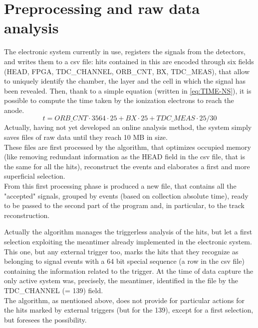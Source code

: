 \documentclass[a4paper,11pt]{book}
\begin{document}
\chapter{Preprocessing and raw data analysis}

The electronic system currently in use, registers the signals from the detectors, and writes them to a csv file: hits contained in this are encoded through six fields (HEAD, FPGA, TDC\_CHANNEL, ORB\_CNT, BX, TDC\_MEAS), that allow to uniquely identify the chamber, the layer and the cell in which the signal has been revealed. Then, thank to a simple equation (written in \ref{eq:TIME-NS}), it is possible to compute the time taken by the ionization electrons to reach the anode.
\begin{equation}
t = ORB\_CNT\cdot3564\cdot25+BX\cdot25+TDC\_MEAS\cdot25/30
\label{eq:TIME-NS}
\end{equation}
Actually, having not yet developed an online analysis method, the system simply saves files of raw data until they reach 10 MB in size.\\
These files are first processed by the algorithm, that optimizes occupied memory (like removing redundant information as the HEAD field in the csv file, that is the same for all the hits), reconstruct the events and elaborates a first and more superficial selection.\\
From this first processing phase is produced a new file, that contains all the "accepted" signals, grouped by events (based on collection absolute time), ready to be passed to the second part of the program and, in particular, to the track reconstruction.\\

\begin{footnotesize}
Actually the algorithm manages the triggerless analysis of the hits, but let a first selection exploiting the meantimer already implemented in the electronic system. This one, but any external trigger too, marks the hits that they recognize as belonging to signal events with a 64 bit special sequence (a row in the csv file) containing the information related to the trigger. At the time of data capture the only active system was, precisely, the meantimer, identified in the file by the TDC\_CHANNEL (= 139) field.\\
The algorithm, as mentioned above, does not provide for particular actions for the hits marked by external triggers (but for the 139), except for a first selection, but foresees the possibility.\\
\end{footnotesize}
\end{document}
